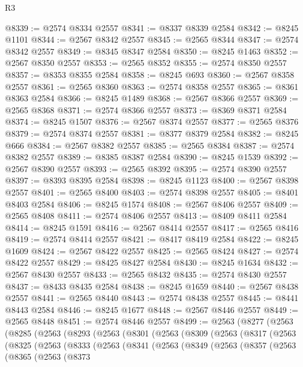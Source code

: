 \begin{lexlean}{R3}
\begin{coremodule}
@8339 := @2574 @8334 @2557
@8341 := @8337 @8339 @2584
@8342 := @8245 @1101
@8344 := @2567 @8342 @2557
@8345 := @2565 @8344
@8347 := @2574 @8342 @2557
@8349 := @8345 @8347 @2584
@8350 := @8245 @1463
@8352 := @2567 @8350 @2557
@8353 := @2565 @8352
@8355 := @2574 @8350 @2557
@8357 := @8353 @8355 @2584
@8358 := @8245 @693
@8360 := @2567 @8358 @2557
@8361 := @2565 @8360
@8363 := @2574 @8358 @2557
@8365 := @8361 @8363 @2584
@8366 := @8245 @1489
@8368 := @2567 @8366 @2557
@8369 := @2565 @8368
@8371 := @2574 @8366 @2557
@8373 := @8369 @8371 @2584
@8374 := @8245 @1507
@8376 := @2567 @8374 @2557
@8377 := @2565 @8376
@8379 := @2574 @8374 @2557
@8381 := @8377 @8379 @2584
@8382 := @8245 @666
@8384 := @2567 @8382 @2557
@8385 := @2565 @8384
@8387 := @2574 @8382 @2557
@8389 := @8385 @8387 @2584
@8390 := @8245 @1539
@8392 := @2567 @8390 @2557
@8393 := @2565 @8392
@8395 := @2574 @8390 @2557
@8397 := @8393 @8395 @2584
@8398 := @8245 @1123
@8400 := @2567 @8398 @2557
@8401 := @2565 @8400
@8403 := @2574 @8398 @2557
@8405 := @8401 @8403 @2584
@8406 := @8245 @1574
@8408 := @2567 @8406 @2557
@8409 := @2565 @8408
@8411 := @2574 @8406 @2557
@8413 := @8409 @8411 @2584
@8414 := @8245 @1591
@8416 := @2567 @8414 @2557
@8417 := @2565 @8416
@8419 := @2574 @8414 @2557
@8421 := @8417 @8419 @2584
@8422 := @8245 @1609
@8424 := @2567 @8422 @2557
@8425 := @2565 @8424
@8427 := @2574 @8422 @2557
@8429 := @8425 @8427 @2584
@8430 := @8245 @1634
@8432 := @2567 @8430 @2557
@8433 := @2565 @8432
@8435 := @2574 @8430 @2557
@8437 := @8433 @8435 @2584
@8438 := @8245 @1659
@8440 := @2567 @8438 @2557
@8441 := @2565 @8440
@8443 := @2574 @8438 @2557
@8445 := @8441 @8443 @2584
@8446 := @8245 @1677
@8448 := @2567 @8446 @2557
@8449 := @2565 @8448
@8451 := @2574 @8446 @2557
@8499 := @2563
    (@8277
      (@2563
        (@8285
          (@2563
            (@8293
              (@2563
                (@8301
                  (@2563
                    (@8309
                      (@2563
                        (@8317
                          (@2563
                            (@8325
                              (@2563
                                (@8333
                                  (@2563
                                    (@8341
                                      (@2563
                                        (@8349
                                          (@2563
                                            (@8357
                                              (@2563
                                                (@8365
                                                  (@2563
                                                    (@8373

\end{coremodule}
\end{lexlean}
